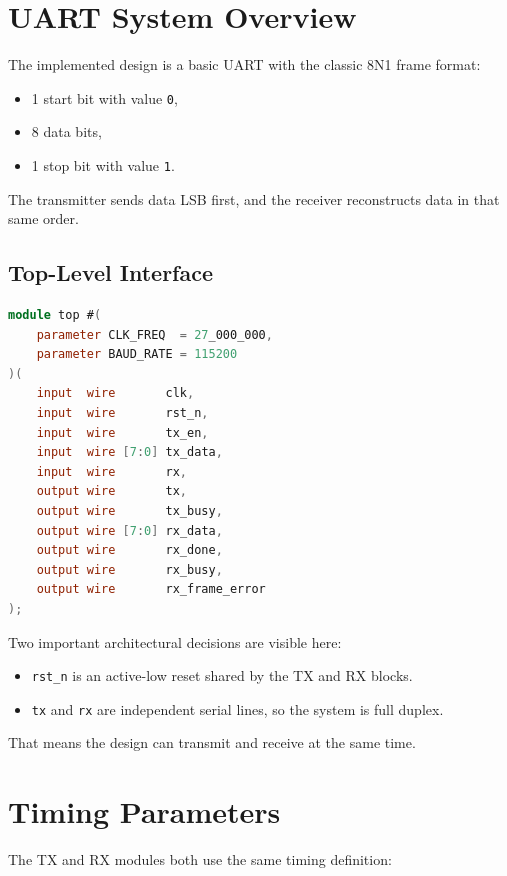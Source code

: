 \documentclass[12pt]{article}
\begin{document}
\section{UART System Overview}

The implemented design is a basic UART with the classic 8N1 frame format:

\begin{itemize}
    \item 1 start bit with value \texttt{0},
    \item 8 data bits,
    \item 1 stop bit with value \texttt{1}.
\end{itemize}

The transmitter sends data LSB first, and the receiver reconstructs data in that
same order.

\subsection*{Top-Level Interface}

\begin{lstlisting}[language=Verilog]
module top #(
    parameter CLK_FREQ  = 27_000_000,
    parameter BAUD_RATE = 115200
)(
    input  wire       clk,
    input  wire       rst_n,
    input  wire       tx_en,
    input  wire [7:0] tx_data,
    input  wire       rx,
    output wire       tx,
    output wire       tx_busy,
    output wire [7:0] rx_data,
    output wire       rx_done,
    output wire       rx_busy,
    output wire       rx_frame_error
);
\end{lstlisting}

Two important architectural decisions are visible here:

\begin{itemize}
    \item \texttt{rst\_n} is an active-low reset shared by the TX and RX blocks.
    \item \texttt{tx} and \texttt{rx} are independent serial lines, so the system
    is full duplex.
\end{itemize}

That means the design can transmit and receive at the same time.

\section{Timing Parameters}

The TX and RX modules both use the same timing definition:
\end{document}
